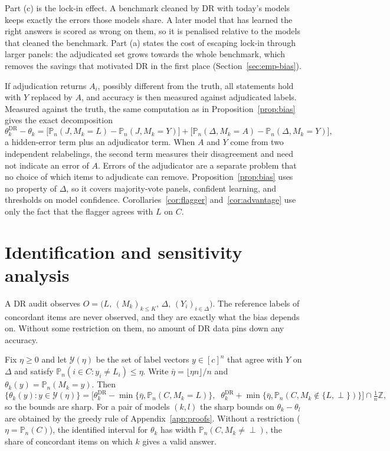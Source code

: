 \documentclass[twoside,11pt]{article}
\newcommand{\Pn}{\mathbb{P}_n}
\newcommand{\1}{\mathbf{1}}
\newcommand{\DR}{\mathrm{DR}}
\newcommand{\Dset}{\Delta}
\newcommand{\Cset}{C}
\newcommand{\inv}{\perp}
\begin{document}
Part (c) is the lock-in effect. A benchmark cleaned by DR with today's models keeps exactly the errors those models share. A later model that has learned the right answers is scored as wrong on them, so it is penalised relative to the models that cleaned the benchmark. Part (a) states the cost of escaping lock-in through larger panels: the adjudicated set grows towards the whole benchmark, which removes the savings that motivated DR in the first place (Section~\ref{sec:emp-bias}).

\begin{remark}\label{rem:adjudicator}
If adjudication returns $A_i$, possibly different from the truth, all statements hold with $Y$ replaced by $A$, and accuracy is then measured against adjudicated labels. Measured against the truth, the same computation as in Proposition~\ref{prop:bias} gives the exact decomposition
\[
\theta^\DR_k-\theta_k=\big[\Pn(J,M_k=L)-\Pn(J,M_k=Y)\big]+\big[\Pn(\Dset,M_k=A)-\Pn(\Dset,M_k=Y)\big],
\]
a hidden-error term plus an adjudicator term. When $A$ and $Y$ come from two independent relabelings, the second term measures their disagreement and need not indicate an error of $A$. Errors of the adjudicator are a separate problem that no choice of which items to adjudicate can remove. Proposition~\ref{prop:bias} uses no property of $\Dset$, so it covers majority-vote panels, confident learning, and thresholds on model confidence. Corollaries~\ref{cor:flagger} and~\ref{cor:advantage} use only the fact that the flagger agrees with $L$ on $\Cset$.
\end{remark}

\section{Identification and sensitivity analysis}
\label{sec:ident}

A DR audit observes $O=\big(L,\,(M_k)_{k\le K},\,\Dset,\,(Y_i)_{i\in\Dset}\big)$. The reference labels of concordant items are never observed, and they are exactly what the bias depends on. Without some restriction on them, no amount of DR data pins down any accuracy.

\begin{theorem}\label{thm:ident}
Fix $\eta\ge0$ and let $\mathcal Y(\eta)$ be the set of label vectors $y\in[c]^n$ that agree with $Y$ on $\Dset$ and satisfy $\Pn(i\in\Cset: y_i\neq L_i)\le\eta$. Write $\bar\eta=\lfloor \eta n\rfloor/n$ and $\theta_k(y)=\Pn(M_k=y)$. Then
\[
\{\theta_k(y): y\in\mathcal Y(\eta)\} = \Big[\theta^\DR_k-\min\{\bar\eta,\Pn(\Cset,M_k=L)\},\;\; \theta^\DR_k+\min\{\bar\eta,\Pn(\Cset,M_k\notin\{L,\inv\})\}\Big]\cap\tfrac1n\mathbb Z,
\]
so the bounds are sharp. For a pair of models $(k,l)$ the sharp bounds on $\theta_k-\theta_l$ are obtained by the greedy rule of Appendix~\ref{app:proofs}. Without a restriction ($\eta=\Pn(\Cset)$), the identified interval for $\theta_k$ has width $\Pn(\Cset, M_k\neq\inv)$, the share of concordant items on which $k$ gives a valid answer.
\end{theorem}
\end{document}
